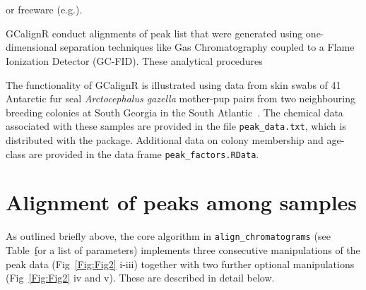 \documentclass[10pt,letterpaper]{article}
\begin{document}
\section*{}
 or freeware (e.g.).

GCalignR conduct alignments of peak list that were generated using one-dimensional separation techniques like Gas Chromatography coupled to a Flame Ionization Detector (GC-FID). These analytical procedures 

The functionality of GCalignR is illustrated using  data from skin swabs of 41 Antarctic fur seal \textit{Arctocephalus gazella} mother-pup pairs from two neighbouring breeding colonies at South Georgia in the South Atlantic~\cite{Stoffel.2015}. The chemical data associated with these samples are provided in the file \texttt{peak\_data.txt}, which is distributed with the package. Additional data on colony membership and age-class are provided in the data frame \texttt{peak\_factors.RData}.

\section*{Alignment of  peaks among samples}
As outlined briefly above, the core algorithm in \texttt{align\_chromatograms} (see Table~\href{table:table1} for a list of parameters) implements three consecutive manipulations of the peak data (Fig~\ref{Fig:Fig2} i-iii) together with two further optional manipulations (Fig~\ref{Fig:Fig2} iv and v). These are described in detail below.
\end{document}
